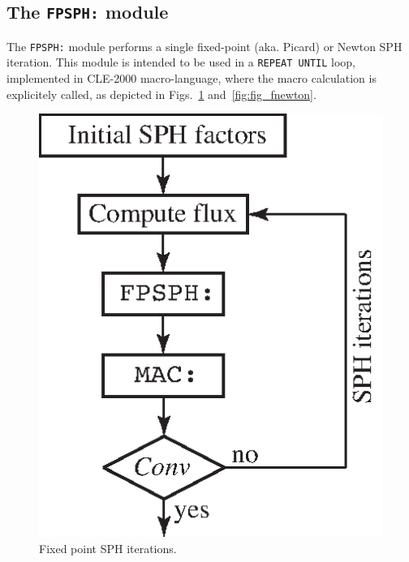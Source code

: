 \subsection{The \texttt{FPSPH:} module}

The {\tt FPSPH:} module performs a single fixed-point (aka. Picard) or Newton SPH iteration. This module is intended to be used in
a {\tt REPEAT UNTIL} loop, implemented in CLE-2000 macro-language, where the macro calculation is explicitely called, as depicted
in Figs.~\ref{fig:fig_fpsph} and~\ref{fig:fig_fnewton}.

\vskip 0.2cm

\begin{figure}[h!]
\begin{center}
\includegraphics[scale=0.85]{Figures/fpsph.eps} 
\caption{Fixed point SPH iterations.}\label{fig:fig_fpsph}
\end{center}
\end{figure}

